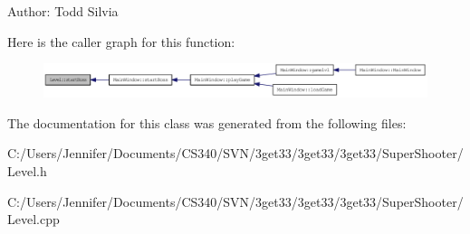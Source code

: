 Author: Todd Silvia 

Here is the caller graph for this function:\nopagebreak
\begin{figure}[H]
\begin{center}
\leavevmode
\includegraphics[width=386pt]{class_level_ae82e5c51006651333ba3ec36541ef12c_icgraph}
\end{center}
\end{figure}


The documentation for this class was generated from the following files:\begin{DoxyCompactItemize}
\item 
C:/Users/Jennifer/Documents/CS340/SVN/3get33/3get33/3get33/SuperShooter/Level.h\item 
C:/Users/Jennifer/Documents/CS340/SVN/3get33/3get33/3get33/SuperShooter/Level.cpp\end{DoxyCompactItemize}
